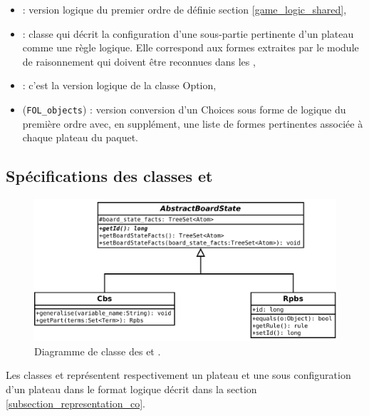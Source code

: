 \begin{itemize}
  \item \textbf{} : version logique du premier ordre de  définie section \vref{game_logic_shared},
  
  \item \textbf{} : classe qui décrit la configuration d'une sous-partie pertinente d'un plateau comme une règle logique. Elle correspond aux \og formes \fg{} extraites par le module de raisonnement qui doivent être reconnues dans les ,
  
   \item \textbf{} : c'est la version logique de la classe \gls{Option},
   \item {} (\texttt{FOL\_objects}) : version conversion d'un \gls{Choices} sous forme de logique du première ordre avec, en supplément, une liste de formes pertinentes associée à chaque plateau du paquet.
\end{itemize}


\subsection{Spécifications des classes  et }
\label{subsection_cbs_rpbs}

\begin{figure}[H] 
\centering
    \includegraphics[width=\textwidth]{files/class_diagram/rpbs_cbs} 
\caption{Diagramme de classe des  et .} 
\label{img_diag_class_board_state}
\end{figure}

Les classes  et  représentent respectivement un plateau et une sous configuration d'un plateau dans le format logique décrit dans la section \vref{subsection_representation_co}. 